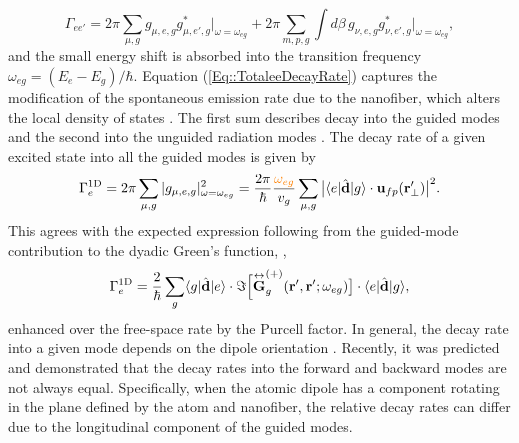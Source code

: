 	\begin{equation}
		\Gamma_{ee'} = 2\pi \sum_{\mu,g} g_{\mu,e,g}g^*_{\mu,e',g} \vert_{\omega=\omega_{eg}}+2\pi 
\sum_{m,p,g} \int d\beta \, g_{\nu,e,g}g^*_{\nu,e',g} \vert_{\omega=\omega_{eg}}, \label{Eq::TotaleeDecayRate}
	\end{equation}
and the small energy shift is absorbed into the transition frequency $\omega_{eg} = (E_e - E_g)/\hbar$.  Equation (\ref{Eq::TotaleeDecayRate}) captures the modification of the spontaneous emission rate due to the nanofiber, which alters the local density of states \cite{LeKien2005a}.  The first sum describes decay into the guided modes and the second into the unguided radiation modes \cite{ Nha1997,Klimov2004,LeKien2005a,Maslov2006}. The decay rate of a given excited state into all the guided modes is given by
	\begin{equation}
		\Gamma_e^{{\rm 1D}}= 2\pi \sum_{\mu,g} |g_{\mu,e,g} |^2_{\omega = \omega_{eg}} =  \frac{ 2\pi }{\hbar} \frac{ {\color{orange} \omega_{eg}} }{v_g} \sum_{\mu,g} \big|\langle{e}\rvert\hat{\mathbf{d}}\lvert{g}\rangle \cdot \mathbf{u}_{fp}(\mathbf{r}'_\perp)\big|^2  .
	\end{equation}
This agrees with the expected expression following from the guided-mode contribution to the dyadic Green's function, ,
	\begin{equation}
		\Gamma_e^{{\rm 1D}} =  \frac{2}{\hbar} \sum_{g}  \langle{g}\rvert\hat{\mathbf{d}}\lvert{e}\rangle\cdot 
\Im \Big[\overset{\leftrightarrow}{\mathbf{G}}^{(+)}_g(\mathbf{r}', \mathbf{r}'; \omega_{eg} ) \big] \cdot \langle{e}\rvert\hat{\mathbf{d}}\lvert{g}\rangle ,
	\end{equation}
enhanced over the free-space rate by the Purcell factor.  In general, the decay rate into a given mode depends on the dipole orientation \cite{Klimov2004, Vos2009}. Recently, it was predicted \cite{LeKien2014a} and demonstrated \cite{Mitsch2014a} that the decay rates into the forward and backward modes are not always equal.  Specifically, when the atomic dipole has a component rotating in the plane defined by the atom and nanofiber, the relative decay rates can differ due to the longitudinal component of the guided modes. 

